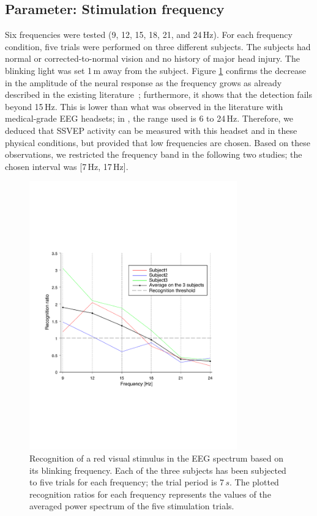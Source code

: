 \documentclass[smallextended]{svjour3}
\begin{document}
\subsection{Parameter: Stimulation frequency}
Six frequencies were tested (9, 12, 15, 18, 21, and 24\,Hz). For each frequency condition, five trials were performed on three different subjects. The subjects had normal or corrected-to-normal vision and no history of major head injury. The blinking light was set 1\,m away from the subject. 
Figure \ref{fig:graph-frequences} confirms the decrease in the amplitude of the neural response as the frequency grows as already described in the existing literature~\cite{herrmann2001}; furthermore, it shows that the detection fails beyond 15\,Hz. 
This is lower than what was observed in the literature with medical-grade EEG headsets; in \cite{SSVEPfiability}, the range used is 6 to 24\,Hz. Therefore, we deduced that SSVEP activity can be measured with this headset and in these physical conditions, but provided that low frequencies are chosen.
Based on these observations, we restricted the frequency band in the following two studies; the chosen interval was [7\,Hz, 17\,Hz].

\begin{figure}
\center
\includegraphics[width=0.8\textwidth]{figures/graph-frequences.pdf}
\caption{Recognition of a red visual stimulus in the EEG spectrum based on its blinking frequency. Each of the three subjects has been subjected to five trials for each frequency; the trial period is 7\,$s$. The plotted recognition ratios for each frequency represents the values of the averaged power spectrum of the five stimulation trials.} \label{fig:graph-frequences}
\end{figure}
\end{document}
